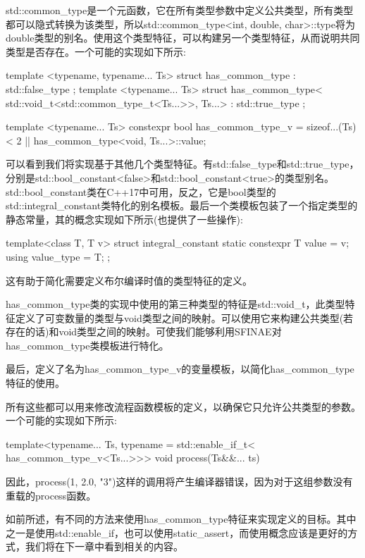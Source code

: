 std::common\_type是一个元函数，它在所有类型参数中定义公共类型，所有类型都可以隐式转换为该类型，所以std::common\_type<int, double, char>::type将为double类型的别名。使用这个类型特征，可以构建另一个类型特征，从而说明共同类型是否存在。一个可能的实现如下所示:

\begin{cpp}
template <typename, typename... Ts>
struct has_common_type : std::false_type {};
template <typename... Ts>
struct has_common_type<
		std::void_t<std::common_type_t<Ts...>>,
		Ts...>
	: std::true_type {};
	
template <typename... Ts>
constexpr bool has_common_type_v =
	sizeof...(Ts) < 2 ||
	has_common_type<void, Ts...>::value;
\end{cpp}

可以看到我们将实现基于其他几个类型特征。有std::false\_type和std::true\_type，分别是std::bool\_constant<false>和std::bool\_constant<true>的类型别名。std::bool\_constant类在C++17中可用，反之，它是bool类型的std::integral\_constant类特化的别名模板。最后一个类模板包装了一个指定类型的静态常量，其的概念实现如下所示(也提供了一些操作):

\begin{cpp}
template<class T, T v>
struct integral_constant
{
	static constexpr T value = v;
	using value_type = T;
};
\end{cpp}

这有助于简化需要定义布尔编译时值的类型特征的定义。

has\_common\_type类的实现中使用的第三种类型的特征是std::void\_t，此类型特征定义了可变数量的类型与void类型之间的映射。可以使用它来构建公共类型(若存在的话)和void类型之间的映射。可使我们能够利用SFINAE对has\_common\_type类模板进行特化。

最后，定义了名为has\_common\_type\_v的变量模板，以简化has\_common\_type特征的使用。

所有这些都可以用来修改流程函数模板的定义，以确保它只允许公共类型的参数。一个可能的实现如下所示:

\begin{cpp}
template<typename... Ts,
		 typename = std::enable_if_t<
						has_common_type_v<Ts...>>>
void process(Ts&&... ts)
{ }
\end{cpp}

因此，process(1, 2.0, "3")这样的调用将产生编译器错误，因为对于这组参数没有重载的process函数。

如前所述，有不同的方法来使用has\_common\_type特征来实现定义的目标。其中之一是使用std::enable\_if，也可以使用static\_assert，而使用概念应该是更好的方式，我们将在下一章中看到相关的内容。









